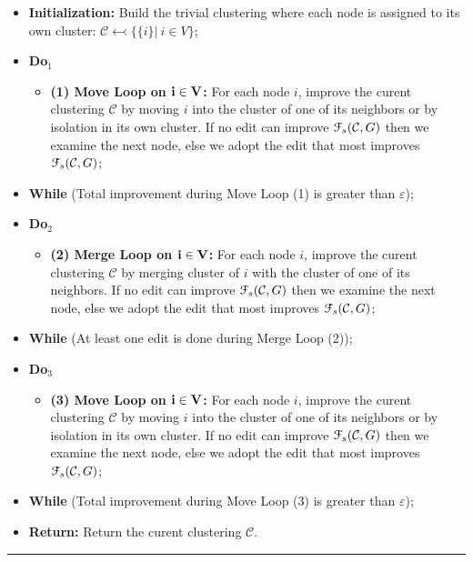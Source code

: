 \documentclass[12pt]{article}
\theoremstyle{thmstyleone}%
\theoremstyle{definition}
\begin{document}
\begin{itemize}
 \item[{\bf }] {\bf Initialization:} Build the trivial clustering where each node is assigned to its own cluster: $\mathcal{C} \leftarrowtail \{\{i\}|~i\in V\}$;

 \item[] {\bf Do$_1$}
    \vspace{-0.40cm}
    \begin{itemize}
    \item[] {\bf (1) Move Loop on $\bf i \in V$:} For each node $i$, improve the curent clustering $\mathcal{C}$ by moving $i$ into the cluster of one of its neighbors or by isolation in its own cluster. If no edit can improve $\EuScript{F}_{s}(\mathcal{C},G)$ then we examine the next node, else we adopt the edit that most improves $\EuScript{F}_{s}(\mathcal{C},G)$;
    \end{itemize}
    \vspace{-0.40cm}
 \item[{\bf }] {\bf While} (Total improvement during Move Loop (1) is greater than $\varepsilon$);

  \item[] {\bf Do$_2$}
  \vspace{-0.40cm}
    \begin{itemize}
    \item[] {\bf (2) Merge Loop on $\bf i \in V$:} For each node $i$, improve the curent clustering $\mathcal{C}$ by merging cluster of $i$ with the cluster of one of its neighbors. If no edit can improve $\EuScript{F}_{s}(\mathcal{C},G)$ then we examine the next node, else we adopt the edit that most improves $\EuScript{F}_{s}(\mathcal{C},G)$;
    \end{itemize}
    \vspace{-0.40cm}
 \item[{\bf }] {\bf While} (At least one edit is done during Merge Loop (2));

 \item[] {\bf Do$_3$}
    \vspace{-0.40cm}
    \begin{itemize}
    \item[] {\bf (3) Move Loop on $\bf i \in V$:} For each node $i$, improve the curent clustering $\mathcal{C}$ by moving $i$ into the cluster of one of its neighbors or by isolation in its own cluster. If no edit can improve $\EuScript{F}_{s}(\mathcal{C},G)$ then we examine the next node, else we adopt the edit that most improves $\EuScript{F}_{s}(\mathcal{C},G)$;
    \end{itemize}
    \vspace{-0.40cm}
 \item[{\bf }] {\bf While} (Total improvement during Move Loop (3) is greater than $\varepsilon$);


 \item[{\bf }] {\bf Return:} Return the curent clustering $\mathcal{C}$.
\end{itemize}
\vspace{-0.5cm}
\noindent
\rule{16cm}{0.025cm}
\end{document}
